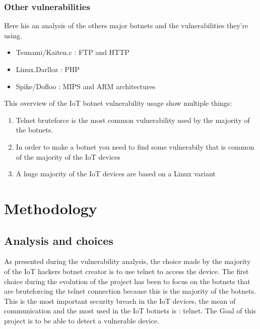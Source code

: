 \documentclass{report}
\begin{document}
\subsection{Other vulnerabilities}
Here his an analysis of the others major botnets and the vulnerabilities they're using.

\begin{itemize}
 \item Tsunami/Kaiten.c\autocite{tsunami} : FTP and HTTP
 \item Linux.Darlloz\autocite{darlloz} : PHP
 \item Spike/Dofloo\autocite{spike} : MIPS and ARM architectures 
\end{itemize}

This overview of the IoT botnet vulnerability usage show multiple things:
\begin{enumerate}
 \item Telnet bruteforce is the most common vulnerability used by the majority of the botnets.
 \item In order to make a botnet you need to find some vulnerabily that is common of the majority of the IoT devices
 \item A huge majority of the IoT devices are based on a Linux variant
\end{enumerate}

\chapter{Methodology}
\section{Analysis and choices}
As presented during the vulnerability analysis, the choice made by the majority of the IoT hackers botnet creator is to use telnet to access the device. \newline
The first choice during the evolution of the project has been to focus on the botnets that are bruteforcing the telnet connection because this is the majority of the botnets.
This is the most important security breach in the IoT devices, the mean of communication and the most used in the IoT botnets is : telnet. The Goal of this project is to be able to detect a vulnerable device.
\end{document}
